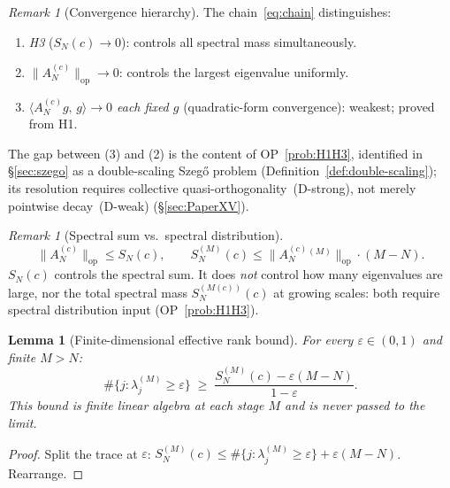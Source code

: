 \documentclass[12pt,a4paper]{amsart}
\newtheorem{lemma}[theorem]{Lemma}
\theoremstyle{definition}
\theoremstyle{remark}
\newtheorem{remark}[theorem]{Remark}
\newcommand{\norm}[1]{\|#1\|}
\newcommand{\ip}[2]{\langle #1,\, #2\rangle}
\newcommand{\Ac}{A_N^{(c)}}
\begin{document}
\begin{remark}[Convergence hierarchy]
\label{rem:convergence-hierarchy}
The chain~\eqref{eq:chain} distinguishes:
\begin{enumerate}[\rm(1)]
\item \emph{H3} ($S_N(c)\to 0$):
  controls all spectral mass simultaneously.
\item \emph{$\norm{\Ac}_{\mathrm{op}}\to 0$}:
  controls the largest eigenvalue uniformly.
\item \emph{$\ip{\Ac g}{g}\to 0$ each fixed $g$}
  (quadratic-form convergence): weakest;
  proved from H1.
\end{enumerate}
The gap between (3) and (2) is the content
of OP~\ref{prob:H1H3}, identified in
\S\ref{sec:szego} as a double-scaling
Szeg\H{o} problem
(Definition~\ref{def:double-scaling});
its resolution requires
collective quasi-orthogonality~(D-strong),
not merely pointwise decay~(D-weak)
(\S\ref{sec:PaperXV}).
\end{remark}

\begin{remark}[Spectral sum vs.\
  spectral distribution]
\label{rem:HS-trace}
\begin{equation}\label{eq:op-SN-relation}
  \norm{\Ac}_{\mathrm{op}} \le S_N(c),
  \qquad
  S_N^{(M)}(c)
  \le \norm{\Ac^{(M)}}_{\mathrm{op}}\cdot(M-N).
\end{equation}
$S_N(c)$ controls the spectral sum.
It does \emph{not} control how many
eigenvalues are large, nor the total
spectral mass $S_N^{(M(c))}(c)$
at growing scales: both require
spectral distribution input
(OP~\ref{prob:H1H3}).
\end{remark}

\begin{lemma}[Finite-dimensional effective
  rank bound]
\label{lem:rank-lower}
For every $\varepsilon\in(0,1)$ and
finite $M>N$:
\begin{equation}\label{eq:eff-rank-M}
  \#\{j:\lambda_j^{(M)}\ge\varepsilon\}
  \;\ge\;
  \frac{S_N^{(M)}(c)-\varepsilon(M-N)}{1-\varepsilon}.
\end{equation}
This bound is finite linear algebra at
each stage $M$ and is never passed to
the limit.
\end{lemma}

\begin{proof}
Split the trace at $\varepsilon$:
$S_N^{(M)}(c)
\le\#\{j:\lambda_j^{(M)}\ge\varepsilon\}
+\varepsilon(M-N)$.
Rearrange.
\end{proof}
\end{document}
